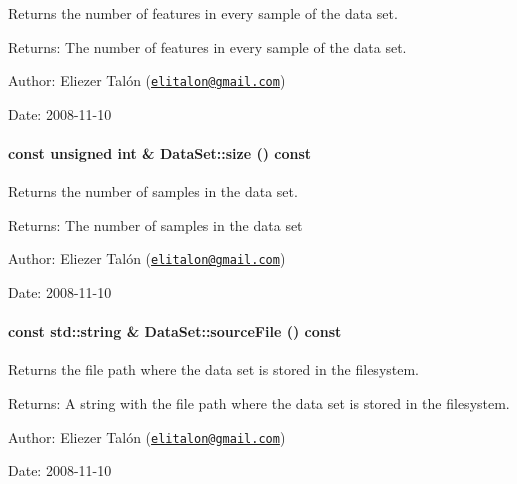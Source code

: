 Returns the number of features in every sample of the data set. 

\begin{Desc}
\item[Returns:]The number of features in every sample of the data set.\end{Desc}
\begin{Desc}
\item[Author:]Eliezer Talón (\href{mailto:elitalon@gmail.com}{\tt elitalon@gmail.com}) \end{Desc}
\begin{Desc}
\item[Date:]2008-11-10 \end{Desc}
\hypertarget{class_data_set_805d7628a3ee31a4d4278deba91c0bbf}{
\paragraph[{size}]{\setlength{\rightskip}{0pt plus 5cm}const unsigned int \& DataSet::size () const}\hfill}
\label{class_data_set_805d7628a3ee31a4d4278deba91c0bbf}


Returns the number of samples in the data set. 

\begin{Desc}
\item[Returns:]The number of samples in the data set\end{Desc}
\begin{Desc}
\item[Author:]Eliezer Talón (\href{mailto:elitalon@gmail.com}{\tt elitalon@gmail.com}) \end{Desc}
\begin{Desc}
\item[Date:]2008-11-10 \end{Desc}
\hypertarget{class_data_set_d7d233212f54f5c2764430b0cb1bea65}{
\paragraph[{sourceFile}]{\setlength{\rightskip}{0pt plus 5cm}const std::string \& DataSet::sourceFile () const}\hfill}
\label{class_data_set_d7d233212f54f5c2764430b0cb1bea65}


Returns the file path where the data set is stored in the filesystem. 

\begin{Desc}
\item[Returns:]A string with the file path where the data set is stored in the filesystem.\end{Desc}
\begin{Desc}
\item[Author:]Eliezer Talón (\href{mailto:elitalon@gmail.com}{\tt elitalon@gmail.com}) \end{Desc}
\begin{Desc}
\item[Date:]2008-11-10 \end{Desc}
